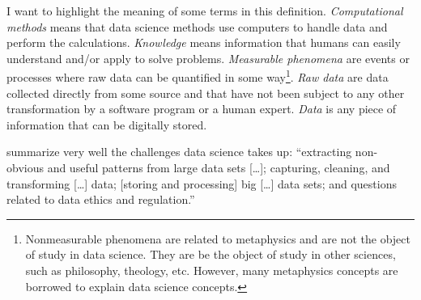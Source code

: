 I want to highlight the meaning of some terms in this definition.  \emph{Computational methods} means
that data science methods use computers to handle data and perform the calculations.
\emph{Knowledge} means information that humans can easily understand and/or apply to solve
problems.  \emph{Measurable phenomena} are events or processes where raw data can be
quantified in some way\footnote{%
  Nonmeasurable phenomena are related to metaphysics and are not the object of study in
  data science.  They are be the object of study in other sciences, such as
  philosophy, theology, etc.  However, many metaphysics concepts are borrowed to
  explain data science concepts.%
}.  \emph{Raw data} are data collected directly from some source and
that have not been subject to any other transformation by a software program or a human
expert.  \emph{Data} is any piece of information that can be digitally stored.


\textcite{Kelleher2018} summarize very well the challenges data science takes up:
``extracting non-obvious and useful patterns from large data sets [\dots]; capturing,
cleaning, and transforming [\dots] data; [storing and processing] big [\dots] data sets;
and questions related to data ethics and regulation.''



